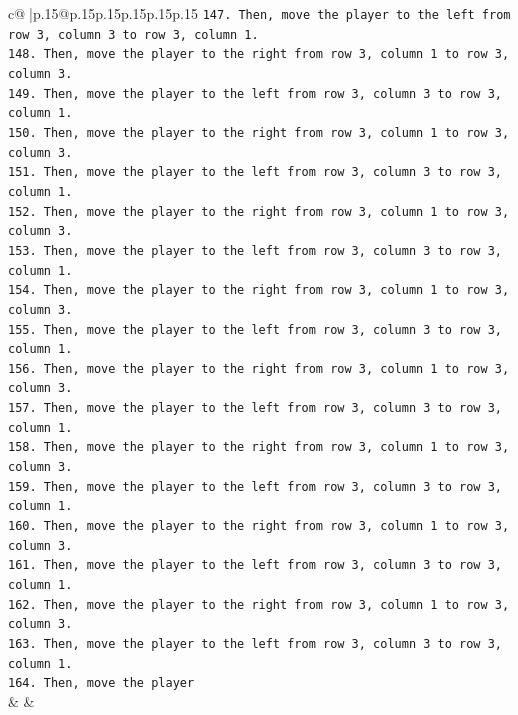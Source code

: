 \documentclass{article}
\begin{document}
{\begin{supertabular}{c@{$\;$}|p{.15\linewidth}@{}p{.15\linewidth}p{.15\linewidth}p{.15\linewidth}p{.15\linewidth}p{.15\linewidth}}
{{{\texttt{147. Then, move the player to the left from row 3, column 3 to row 3, column 1.} \\
\texttt{148. Then, move the player to the right from row 3, column 1 to row 3, column 3.} \\
\texttt{149. Then, move the player to the left from row 3, column 3 to row 3, column 1.} \\
\texttt{150. Then, move the player to the right from row 3, column 1 to row 3, column 3.} \\
\texttt{151. Then, move the player to the left from row 3, column 3 to row 3, column 1.} \\
\texttt{152. Then, move the player to the right from row 3, column 1 to row 3, column 3.} \\
\texttt{153. Then, move the player to the left from row 3, column 3 to row 3, column 1.} \\
\texttt{154. Then, move the player to the right from row 3, column 1 to row 3, column 3.} \\
\texttt{155. Then, move the player to the left from row 3, column 3 to row 3, column 1.} \\
\texttt{156. Then, move the player to the right from row 3, column 1 to row 3, column 3.} \\
\texttt{157. Then, move the player to the left from row 3, column 3 to row 3, column 1.} \\
\texttt{158. Then, move the player to the right from row 3, column 1 to row 3, column 3.} \\
\texttt{159. Then, move the player to the left from row 3, column 3 to row 3, column 1.} \\
\texttt{160. Then, move the player to the right from row 3, column 1 to row 3, column 3.} \\
\texttt{161. Then, move the player to the left from row 3, column 3 to row 3, column 1.} \\
\texttt{162. Then, move the player to the right from row 3, column 1 to row 3, column 3.} \\
\texttt{163. Then, move the player to the left from row 3, column 3 to row 3, column 1.} \\
\texttt{164. Then, move the player} \\
            }
        }
    }
    & & \\ \\


\end{supertabular}}
\end{document}
